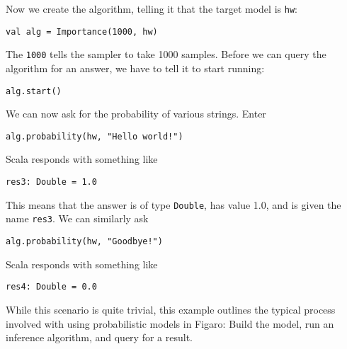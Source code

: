 Now we create the algorithm, telling it that the target model is \texttt{hw}:

\begin{flushleft}
\texttt{val alg = Importance(1000, hw)}
\end{flushleft}

The \texttt{1000} tells the sampler to take 1000 samples. Before we can query the algorithm for an answer, we have to tell it to start running:

\begin{flushleft}
\texttt{alg.start()}
\end{flushleft}
We can now ask for the probability of various strings. Enter

\begin{flushleft}
\texttt{alg.probability(hw, "Hello world!")}
\end{flushleft}
Scala responds with something like

\begin{flushleft}
\texttt{res3: Double = 1.0}
\end{flushleft}
This means that the answer is of type \texttt{Double}, has value 1.0, and is given the name \texttt{res3}. We can similarly ask

\begin{flushleft}
\texttt{alg.probability(hw, "Goodbye!")}
\end{flushleft}

Scala responds with something like

\begin{flushleft}
\texttt{res4: Double = 0.0}
\end{flushleft}

While this scenario is quite trivial, this example outlines the typical process involved with using probabilistic models in Figaro: Build the model, run an inference algorithm, and query for a result.







